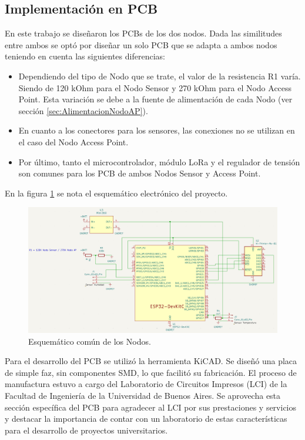 \subsection{Implementación en PCB}
\label{sec:PCB}

En este trabajo se diseñaron los PCBs de los dos nodos. Dada las similitudes entre ambos se optó por diseñar un solo PCB que se adapta a ambos nodos teniendo en cuenta las siguientes diferencias:
\begin{itemize}
    \item Dependiendo del tipo de Nodo que se trate, el valor de la resistencia R1 varía. Siendo de 120 kOhm para el Nodo Sensor y 270 kOhm para el Nodo Access Point.
Esta variación se debe a la fuente de alimentación de cada Nodo (ver sección \ref{sec:AlimentacionNodoAP}).
\item En cuanto a los conectores para los sensores, las conexiones no se utilizan en el caso del Nodo Access Point.
\item Por último, tanto el microcontrolador, módulo LoRa y el regulador de tensión son comunes para los PCB de ambos Nodos Sensor y Access Point.
\end{itemize}

En la figura \ref{fig:esquematico} se nota el esquemático electrónico del proyecto.
\label{sec:EsquematicoGral}
\begin{figure}[H]
	\centering
	\includegraphics[scale=0.5]{./Figures/Esquematicos/esquematico.png}
	\caption{Esquemático común de los Nodos.}
	\label{fig:esquematico}
\end{figure}



Para el desarrollo del PCB se utilizó la herramienta KiCAD\citep{KiCadWebsite}. Se diseñó una placa de simple faz, sin componentes SMD, lo que facilitó su fabricación. El proceso de manufactura estuvo a cargo del Laboratorio de Circuitos Impresos (LCI) de la Facultad de Ingeniería de la Universidad de Buenos Aires.
Se aprovecha esta sección específica del PCB para agradecer al LCI por sus prestaciones y servicios y destacar la importancia de contar con un laboratorio de estas características para el desarrollo de proyectos universitarios.

